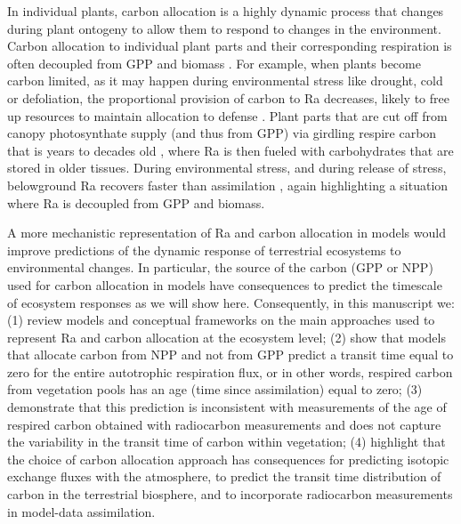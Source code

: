 \documentclass[bg, manuscript]{copernicus}
\begin{document}

In individual plants, carbon allocation is a highly dynamic process that changes during plant ontogeny to allow them to respond to changes in the environment. Carbon allocation to individual plant parts and their corresponding respiration is often decoupled from GPP and biomass \citep{Collalti2019}. For example, when plants become carbon limited, as it may happen during environmental stress like drought, cold or defoliation, the proportional provision of carbon to Ra decreases, likely to free up resources to maintain allocation to defense \citep{Huang2019EEB,Huang2019NP}. Plant parts that are cut off from canopy photosynthate supply (and thus from GPP) via girdling respire carbon that is years to decades old \citep{muhr:2013}, where Ra is then fueled with carbohydrates that are stored in older tissues. During environmental stress, and during release of stress, belowground Ra recovers faster than assimilation \citep{Hagedorn2016}, again highlighting a situation where Ra is decoupled from GPP and biomass.

A more mechanistic representation of Ra and carbon allocation in models would improve predictions of the dynamic response of terrestrial ecosystems to environmental changes. In particular, the source of the carbon (GPP or NPP) used for carbon allocation in models have consequences to predict the timescale of ecosystem responses as we will show here. 
Consequently, in this manuscript we: (1) review models and conceptual frameworks on the main approaches used to represent Ra and carbon allocation at the ecosystem level; (2) show that models that allocate carbon from NPP and not from GPP predict a transit time equal to zero for the entire autotrophic respiration flux, or in other words, respired carbon from vegetation pools has an age (time since assimilation) equal to zero; (3) demonstrate that this prediction is inconsistent with measurements of the age of respired carbon obtained with radiocarbon measurements and does not capture the variability in the transit time of carbon within vegetation; (4) highlight that the choice of carbon allocation approach has consequences for predicting isotopic exchange fluxes with the atmosphere, to predict the transit time distribution of carbon in the terrestrial biosphere, and to incorporate radiocarbon measurements in model-data assimilation. 
\end{document}
